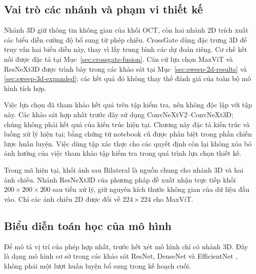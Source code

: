 \documentclass[14pt,a4paper,oneside]{extreport}
\begin{document}
\subsection{Vai trò các nhánh và phạm vi thiết kế}
\label{sec:selected-configuration}
Nhánh 3D giữ thông tin không gian của khối OCT, còn hai nhánh 2D
trích xuất các biểu diễn cường độ bổ sung từ phép chiếu. CrossGate
dùng đặc trưng 3D để truy vấn hai biểu diễn này, thay vì lấy trung
bình các dự đoán riêng. Cơ chế kết nối được đặc tả tại
Mục~\ref{sec:crossgate-fusion}. Căn cứ lựa chọn MaxViT và ResNeXt3D
được trình bày trong các khảo sát tại Mục~\ref{sec:sweep-2d-results}
và \ref{sec:sweep-3d-expanded}; các kết quả đó không thay thế đánh giá
của toàn bộ mô hình tích hợp.

Việc lựa chọn đã tham khảo kết quả trên tập kiểm tra, nên không độc lập
với tập này. Các khảo sát hợp nhất trước đây sử dụng
ConvNeXtV2--ConvNeXt3D; chúng không phải kết quả của kiến trúc hiện tại.
Chương này đặc tả kiến trúc và luồng xử lý hiện tại; bằng chứng từ
notebook cũ được phân biệt trong phần chiến lược huấn luyện.
Việc dùng tập xác thực cho các quyết định còn lại không xóa bỏ ảnh
hưởng của việc tham khảo tập kiểm tra trong quá trình lựa chọn thiết kế.

Trong mã hiện tại, khối ảnh sau Bilateral là nguồn chung cho nhánh 3D và hai ảnh chiếu.
Nhánh ResNeXt3D của phương pháp đề xuất nhận trực tiếp khối
$200\times200\times200$ sau tiền xử lý, giữ nguyên kích thước không
gian của dữ liệu đầu vào. Chỉ các ảnh chiếu 2D được đổi về
$224\times224$ cho MaxViT. 


\subsection{Biểu diễn toán học của mô hình}

Để mô tả vị trí của phép hợp nhất, trước hết xét mô hình chỉ có nhánh
3D. Đây là dạng mô hình cơ sở trong các khảo sát ResNet, DenseNet và
EfficientNet \cite{he2016resnet,huang2017densenet,tan2019efficientnet},
không phải một lượt huấn luyện bổ sung trong kế hoạch cuối.
\end{document}
